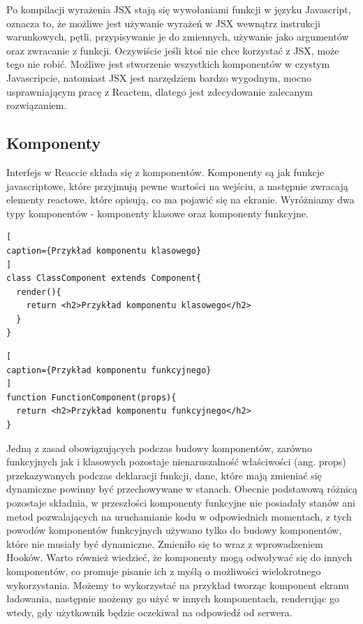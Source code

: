 \documentclass[oneside,polski,logo,indent]{amuthesis}
\begin{document}
{Po kompilacji wyrażenia JSX stają się wywołaniami funkcji w języku Javascript, oznacza to, że możliwe jest używanie wyrażeń w JSX wewnątrz instrukcji warunkowych, pętli, przypisywanie je do zmiennych, używanie jako argumentów oraz zwracanie z funkcji.
Oczywiście jeśli ktoś nie chce korzystać z JSX, może tego nie robić. Możliwe jest stworzenie wszystkich komponentów w czystym Javascripcie, natomiast JSX jest narzędziem bardzo wygodnym, mocno usprawniającym pracę z Reactem, dlatego jest zdecydowanie zalecanym rozwiązaniem.

}

\subsection{Komponenty}
{
Interfejs w Reaccie składa się z komponentów. Komponenty są jak funkcje javascriptowe, które przyjmują pewne wartości na wejściu, a następnie zwracają elementy reactowe, które opisują, co ma pojawić się na ekranie.
Wyróżniamy dwa typy komponentów - komponenty klasowe oraz komponenty funkcyjne.


\begin{lstlisting}[
caption={Przykład komponentu klasowego}
]
class ClassComponent extends Component{
  render(){
    return <h2>Przykład komponentu klasowego</h2>
  }
}

\end{lstlisting}


\begin{lstlisting}[
caption={Przykład komponentu funkcyjnego}
]
function FunctionComponent(props){
  return <h2>Przykład komponentu funkcyjnego</h2>
}

\end{lstlisting}

Jedną z zasad obowiązujących podczas budowy komponentów, zarówno funkcyjnych jak i klasowych pozostaje nienaruszalność właściwości (ang. props) przekazywanych podczas deklaracji funkcji, dane, które mają zmieniać się dynamiczne powinny być przechowywane w stanach.
Obecnie podstawową różnicą pozostaje składnia, w przeszłości komponenty funkcyjne nie posiadały stanów ani metod pozwalających na uruchamianie kodu w odpowiednich momentach, z tych powodów komponentów funkcyjnych używano tylko do budowy komponentów, które nie musiały być dynamiczne. Zmieniło się to wraz z wprowadzeniem Hooków.
Warto również wiedzieć, że komponenty mogą odwoływać się do innych komponentów, co promuje pisanie ich z myślą o możliwości wielokrotnego wykorzystania. Możemy to wykorzystać na przykład tworząc komponent ekranu ładowania, następnie możemy go użyć w innych komponentach, renderując go wtedy, gdy użytkownik będzie oczekiwał na odpowiedź od serwera.



}
\end{document}
